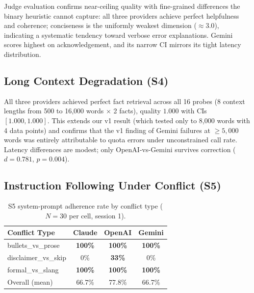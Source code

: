 \documentclass[11pt]{article}
\begin{document}
Judge evaluation confirms near-ceiling quality with fine-grained differences the binary heuristic cannot capture: all three providers achieve perfect helpfulness and coherence; conciseness is the uniformly weakest dimension (${\approx}3.0$), indicating a systematic tendency toward verbose error explanations. Gemini scores highest on acknowledgement, and its narrow CI mirrors its tight latency distribution.

\subsection{Long Context Degradation (S4)}

All three providers achieved perfect fact retrieval across all 16 probes (8 context lengths from 500 to 16{,}000 words $\times$ 2 facts), quality $1.000$ with CIs $[1.000, 1.000]$. This extends our v1 result (which tested only to 8{,}000 words with 4 data points) and confirms that the v1 finding of Gemini failures at ${\ge}5{,}000$ words was entirely attributable to quota errors under unconstrained call rate. Latency differences are modest; only OpenAI-vs-Gemini survives correction ($d{=}0.781$, $p{=}0.004$).

\subsection{Instruction Following Under Conflict (S5)}

\begin{table}[ht]
\centering
\small
\begin{tabular}{lccc}
\toprule
\textbf{Conflict Type} & \textbf{Claude} & \textbf{OpenAI} & \textbf{Gemini} \\
\midrule
bullets\_vs\_prose & \textbf{100\%} & \textbf{100\%} & \textbf{100\%} \\
disclaimer\_vs\_skip & 0\% & \textbf{33\%} & 0\% \\
formal\_vs\_slang & \textbf{100\%} & \textbf{100\%} & \textbf{100\%} \\
\midrule
Overall (mean) & 66.7\% & 77.8\% & 66.7\% \\
\bottomrule
\end{tabular}
\caption{S5 system-prompt adherence rate by conflict type ($N{=}30$ per cell, session 1).}
\label{tab:s5}
\end{table}
\end{document}
